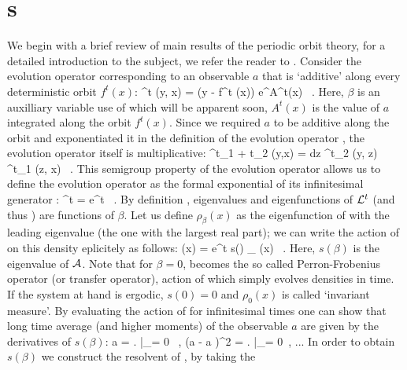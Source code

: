 \section{\CycForm s}
\label{s:DynAvers}
We begin with a brief review of main results of the periodic 
orbit theory, for a detailed introduction to the subject, we refer the reader to 
. Consider the evolution operator corresponding to an observable 
$a$ that is `additive' along every deterministic orbit $f^t(x)$:
\beq
	\Lop^t (y, x) = \delta (y - f^t (x)) e^{\beta A^t(x)} \, .
	\label{eq-EvOp}
\eeq
Here, $\beta$ is an auxilliary variable use of which will be apparent soon, 
$A^t (x)$ is the value of $a$ integrated along the orbit $f^t(x)$.
Since we required $a$ to be additive along the orbit and exponentiated
it in the definition of the evolution operator , the
evolution operator itself is multiplicative:
\beq
	\Lop^{t_1 + t_2} (y,x) = \int dz \Lop^{t_2} (y, z) \Lop^{t_1} (z, x) \, . 
	\label{eq-SemiGroup}
\eeq
This semigroup property of the evolution operator allows us to define
the evolution operator as the formal exponential of its infinitesimal
generator \Aop :
\beq
	\Lop^t = e^{\Aop t} \, . 
	\label{eq-EvOpExp}
\eeq 
By definition , eigenvalues and eigenfunctions of ${\cal L}^t$ (and 
thus \Aop ) are functions of $\beta$. Let us define $\rho_{\beta} (x)$ as the 
eigenfunction of  with the leading eigenvalue (the one with the 
largest real part); we can write the action of  on this density 
eplicitely as follows:
\beq
     (x) = e^{t s(\beta )} \rho_{\beta} (x) \, .
    \label{eq-EigenvalueRel}
\eeq
Here, $s(\beta)$ is the eigenvalue of ${\cal A}$. Note that for $\beta = 0$, 
 becomes the so called Perron-Frobenius operator (or transfer operator),
action of which simply evolves densities in time. If the system at hand is ergodic, 
$s(0) = 0$ and $\rho_0 (x)$ is called `invariant measure'. By evaluating the action 
of  for infinitesimal times one can show that long time average
(and higher moments) of the observable $a$ are given by the derivatives of $s(\beta)$:
\beq
    \langle a \rangle = \left.  \right|_{\beta = 0} \, , \quad
    \langle (a - \langle a \rangle )^2 \rangle = \left.  
                                                     \right|_{\beta = 0} \,, ...
    \label{eq-moments}                                                    
\eeq
In order to obtain $s(\beta)$ we construct the resolvent of \Aop , by taking the 
